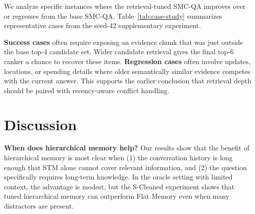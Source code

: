 \documentclass{article}
\begin{document}
We analyze specific instances where the retrieval-tuned SMC-QA improves over or regresses from the base SMC-QA. Table~\ref{tab:case-study} summarizes representative cases from the seed-42 supplementary experiment.

\begin{table}[h]
\centering
\caption{Representative case studies from the retrieval-tuned SMC-QA analysis.}
\label{tab:case-study}
\end{table}

\textbf{Success cases} often require exposing an evidence chunk that was just outside the base top-4 candidate set. Wider candidate retrieval gives the final top-6 ranker a chance to recover these items. \textbf{Regression cases} often involve updates, locations, or spending details where older semantically similar evidence competes with the current answer. This supports the earlier conclusion that retrieval depth should be paired with recency-aware conflict handling.

\section{Discussion}

\textbf{When does hierarchical memory help?} Our results show that the benefit of hierarchical memory is most clear when (1) the conversation history is long enough that STM alone cannot cover relevant information, and (2) the question specifically requires long-term knowledge. In the oracle setting with limited context, the advantage is modest, but the S-Cleaned experiment shows that tuned hierarchical memory can outperform Flat Memory even when many distractors are present.
\end{document}
